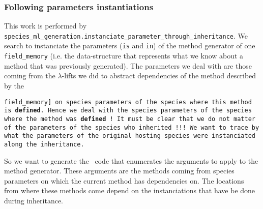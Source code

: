 \subsubsection{Following parameters instantiations}
This work is performed by
{\tt species\_ml\_generation.instanciate\_parameter\_through\_inheritance}.
We search to instanciate the parameters ({\tt is} and {\tt in}) of the
method generator of one {\tt field\_memory} (i.e. the data-structure that
represents what we know about a method that was previously
generated). The parameters we deal with are those coming from the
$\lambda$-lifts we did to abstract dependencies of the method
described by the {\tt field\_memory] on species parameters of the species
where this method is {\bf defined}.
Hence we deal with the species parameters of the species where the
method was {\bf defined} ! It must be clear that we do not matter of
the parameters of the species who inherited !!! We want to trace by
what the parameters of the original hosting species were instanciated
along the inheritance.

So we want to generate the \ocaml\ code that enumerates the arguments to
apply to the method generator. These arguments are the methods coming
from species parameters on which the current method has dependencies
on. The locations from where these methods come depend on the
instanciations that have be done during inheritance.

}
